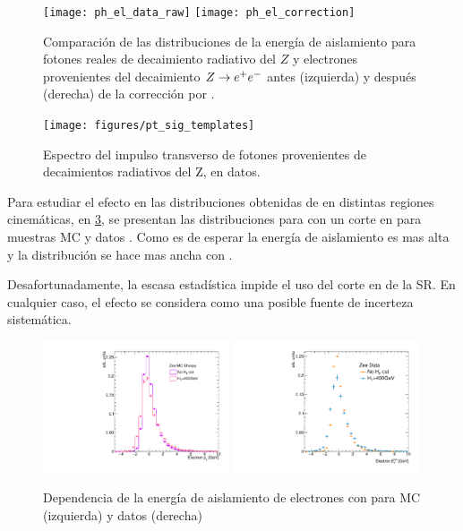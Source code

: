 \begin{figure}[!htbp]
  \centering

  \texttt{[image: ph\_el\_data\_raw]}
  \texttt{[image: ph\_el\_correction]}

  \caption{Comparación de las distribuciones de la energía de aislamiento para fotones reales de
    decaimiento radiativo del $Z$ y electrones provenientes del decaimiento $Z \rightarrow e^+ e^-$ antes (izquierda)
    y después (derecha) de la corrección por \pt.}
    \label{fig:photon_electron_iso}

\end{figure}

\begin{figure}[!htbp]
  \centering

  \texttt{[image: figures/pt\_sig\_templates]}

  \caption{Espectro del impulso transverso de fotones provenientes de decaimientos
    radiativos del Z, en datos.}
  \label{fig:zllg_pt}

\end{figure}

Para estudiar el efecto en las distribuciones obtenidas de {\Zee} en distintas
regiones cinemáticas, en \cref{fig:electron_iso_HT}, se presentan las
distribuciones para con un corte en {\HT} para muestras MC y datos {\Zee}. Como
es de esperar la energía de aislamiento es mas alta y la distribución se hace
mas ancha con \HT.

Desafortunadamente, la escasa estadística impide el uso del corte en {\HT} de la
SR. En cualquier caso, el efecto se considera como una posible fuente de
incerteza sistemática.

\begin{figure}[!htbp]
  \centering

  \includegraphics[width=0.49\textwidth]{figures/electron_iso_ZeeHMC_corr}
  \includegraphics[width=0.49\textwidth]{figures/electron_iso_ZeeH_corr}

  \caption{Dependencia de la energía de aislamiento de electrones con {\HT}
    para MC (izquierda) y datos (derecha) \Zee}
    \label{fig:electron_iso_HT}

\end{figure}



